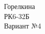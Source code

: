 \documentclass{article}
\begin{document}
\begin{flushright}

\Large Горелкина \\ РК6-32Б \\ Вариант №4

\end{flushright}

\vspace{\baselineskip}\vspace{\baselineskip}\vspace{\baselineskip}\vspace{\baselineskip}\vspace{\baselineskip}\vspace{\baselineskip}\vspace{\baselineskip}\vspace{\baselineskip}\vspace{\baselineskip}
\end{document}
